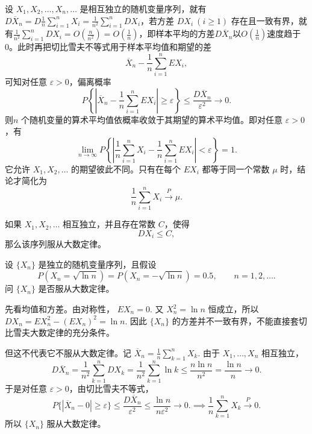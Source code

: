 \documentclass[lang=cn,11pt]{elegantbook}
\begin{document}
\begin{theorem}[切比雪夫大数定律] \label{thm:chebyshev-lln}
设 \(X_1, X_2, \dots, X_n, \dots\) 是相互独立的随机变量序列，就有\(\displaystyle D\overline{X}_n=D\frac1n \sum_{i=1}^n X_i=\frac1{n^2}\sum_{i=1}^n DX_i\)，若方差 \(DX_i\ (i \geq 1)\) 存在且一致有界，就有\(\frac1{n^2}\sum_{i=1}^n DX_i=O(\frac{n}{n^2})=O(\frac1n)\)，即样本平均的方差$D\overline{X}_n$以$O(\frac{1}{n})$速度趋于0。此时再把切比雪夫不等式用于样本平均值和期望的差
\[
\overline{X}_n-\frac1n\sum_{i=1}^n EX_i,
\]
可知对任意 \(\varepsilon>0\)，偏离概率
\[
P\!\left\{\left|\overline{X}_n-\frac1n\sum_{i=1}^n EX_i\right|\ge\varepsilon\right\}
\le \frac{D\overline{X}_n}{\varepsilon^2}\to0.
\]
则\(n\) 个随机变量的算术平均值依概率收敛于其期望的算术平均值。即对任意 \(\varepsilon > 0\)，有
\[
\lim_{n\to\infty} P\!\left\{\left|\frac{1}{n}\sum_{i=1}^{n} X_i - \frac{1}{n}\sum_{i=1}^{n} EX_i\right| < \varepsilon\right\} = 1.
\]它允许 \(X_1,X_2,\dots\) 的期望彼此不同。只有在每个 \(EX_i\) 都等于同一个常数 \(\mu\) 时，结论才简化为
\[
\frac{1}{n}\sum_{i=1}^{n} X_i \stackrel{P}{\longrightarrow} \mu.
\]
\end{theorem}

\begin{theorem}[证明某分布服从大数定律]
如果 \(X_1,X_2,\dots\) 相互独立，并且存在常数 \(C\)，使得
\[
DX_i\le C,
\]那么该序列服从大数定律。
\end{theorem}

\begin{exercise}\label{exer:src-lln-log-n}
设 \(\{X_n\}\) 是独立的随机变量序列，且假设
\[
P(X_n=\sqrt{\ln n})=P(X_n=-\sqrt{\ln n})=0.5,\qquad n=1,2,\dots.
\]
问 \(\{X_n\}\) 是否服从大数定律。
\end{exercise}
\begin{solution}
先看均值和方差。由对称性，
\(
EX_n=0.
\)
又
\(
X_n^2=\ln n
\)
恒成立，所以
\(
DX_n=EX_n^2-(EX_n)^2=\ln n.
\)
因此 \(\{X_n\}\) 的方差并不一致有界，不能直接套切比雪夫大数定律的充分条件。

但这不代表它不服从大数定律。记
\(
\overline X_n=\frac1n\sum_{k=1}^nX_k.
\)
由于 \(X_1,\dots,X_n\) 相互独立，
\[
D\overline X_n
=\frac1{n^2}\sum_{k=1}^nDX_k
=\frac1{n^2}\sum_{k=1}^n\ln k
\le \frac{n\ln n}{n^2}
=\frac{\ln n}{n}\to0.
\]
于是对任意 \(\varepsilon>0\)，由切比雪夫不等式，
\[
P\{|\overline X_n-0|\ge\varepsilon\}
\le \frac{D\overline X_n}{\varepsilon^2}
\le \frac{\ln n}{n\varepsilon^2}\to0.
\implies
\frac1n\sum_{k=1}^nX_k\stackrel{P}{\longrightarrow}0.
\]
所以 \(\{X_n\}\) 服从大数定律。
\end{solution}
\end{document}
